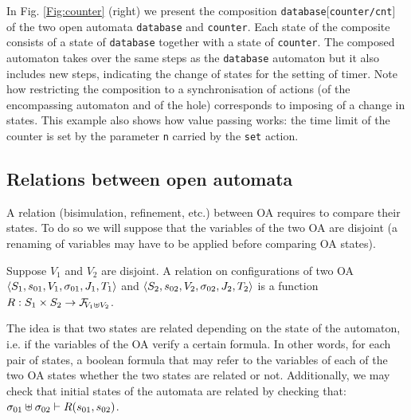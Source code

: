 \documentclass[runningheads]{llncs}
\begin{document}
\begin{example}
In Fig. \ref{Fig:counter} (right) we present the composition \texttt{database}[\texttt{counter/cnt}] of the two open automata \texttt{database} and \texttt{counter}. Each state of the composite consists of a state of \texttt{database} together with a state of \texttt{counter}. The composed automaton  takes over  the same steps as the   \texttt{database} automaton but it also includes new steps,  indicating the change of states for the setting of timer.  Note how restricting the composition to a synchronisation of actions (of the encompassing automaton and  of the hole) corresponds to imposing of a change in states. This example also shows how value passing works: the time limit of the counter is set by the parameter \texttt{n} carried by  the \texttt{set} action.
\end{example}



\subsection{Relations between open automata}
A relation (bisimulation, refinement, etc.) between OA requires to compare their states. To do so we will suppose that the variables of the two OA are disjoint (a renaming of variables may have to be applied before comparing OA states).
\begin{definition} Suppose $V_1$ and $V_2$ are disjoint.
A relation on configurations of two OA \(\OAg[1]\) and \(\OAg[2]\) is a function \(R: S_1 \times S_2 \to \rformulas[V_1 \uplus V_2]\).
\end{definition}
The idea is that two states are related depending on the state of the automaton, i.e. if the variables of the OA verify a certain formula. 
In other words, for each pair of states, a boolean formula that may refer to the  variables of each of the two OA states whether the two states are related or not.
Additionally, we may check that initial states of the automata are related by checking that: \(\sigma_{01} \uplus \sigma_{02} \vdash R\mpar{s_{01}, s_{02}}\).

\end{document}
